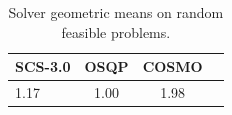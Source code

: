 \begin{table}
\centering
\caption{Solver geometric means on random feasible problems.}
\label{t-random feasible-geom_mean}
\begin{tabular}{lccc}
\toprule
 SCS-3.0 &  OSQP &  COSMO \\
\midrule
    1.17 &  1.00 &   1.98 \\
\bottomrule
\end{tabular}
\end{table}

